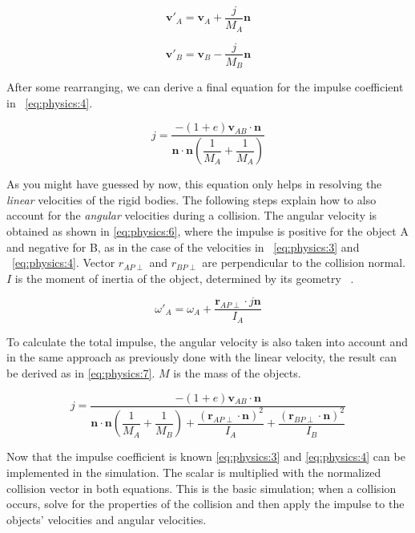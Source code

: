 \documentclass[a4paper,12pt]{report}
\begin{document}
\begin{equation}
\mathbf v'_{A}=\mathbf v_{A}+\dfrac{j}{M_{A}}\mathbf n
\label{eq:physics:3}
\end{equation}

\begin{equation}
\mathbf v'_{B}=\mathbf v_{B}-\dfrac{j}{M_{B}}\mathbf n
\label{eq:physics:4}
\end{equation}

After some rearranging, we can derive a final equation for the impulse coefficient in ~\eqref{eq:physics:4}.

\begin{equation}
j = \dfrac{ -(1+e) \mathbf v_{AB} \cdot \mathbf n }{
    \mathbf n \cdot \mathbf n ( \dfrac{1}{M_{A}} + \dfrac{1}{M_{A}} )}
\label{eq:physics:5}
\end{equation}

As you might have guessed by now, this equation only helps in resolving the \emph{linear} velocities of the rigid bodies. The following steps explain how to also account for the \emph{angular} velocities during a collision. The angular velocity is obtained as shown in \eqref{eq:physics:6}, where the impulse is positive for the object A and negative for B, as in the case of the velocities in ~\eqref{eq:physics:3} and ~\eqref{eq:physics:4}. Vector $r_{AP\perp}$ and $r_{BP\perp}$ are perpendicular to the collision normal. $I$ is the moment of inertia of the object, determined by its geometry ~\cite{moi}.

\begin{equation}
\omega'_{A}=\omega_{A}+\dfrac{\mathbf r_{AP\perp}\cdot j\mathbf n}{I_{A}}
\label{eq:physics:6}
\end{equation}

To calculate the total impulse, the angular velocity is also taken into account and in the same approach as previously done with the linear velocity, the result can be derived as in \eqref{eq:physics:7}. $M$ is the mass of the objects.

\begin{equation}
j = \dfrac{ -(1+e) \mathbf v_{AB} \cdot \mathbf n }{
    \mathbf n \cdot \mathbf n ( \dfrac{1}{M_{A}} + \dfrac{1}{M_{B}} )
    + \dfrac{ (\mathbf r_{AP\perp} \cdot \mathbf n)^2}{I_{A} }
    + \dfrac{ (\mathbf r_{BP\perp} \cdot \mathbf n)^2}{I_{B} } }
\label{eq:physics:7}
\end{equation}

Now that the impulse coefficient is known \eqref{eq:physics:3} and \eqref{eq:physics:4} can be implemented in the simulation. The scalar is multiplied with the normalized collision vector in both equations. This is the basic simulation; when a collision occurs, solve for the properties of the collision and then apply the impulse to the objects' velocities and angular velocities.
\end{document}
